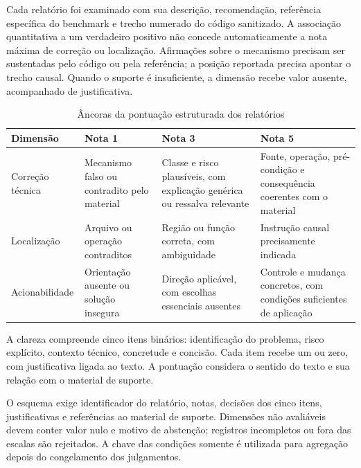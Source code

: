 Cada relatório foi examinado com sua descrição, recomendação, referência
específica do benchmark e trecho numerado do código sanitizado. A associação
quantitativa a um verdadeiro positivo não concede automaticamente a nota máxima
de correção ou localização. Afirmações sobre o mecanismo precisam ser
sustentadas pelo código ou pela referência; a posição reportada precisa apontar
o trecho causal. Quando o suporte é insuficiente, a dimensão recebe valor
ausente, acompanhado de justificativa.

\begin{table}[htbp]
\ABNTEXfontereduzida
\caption{\label{tab:rubrica-pontuacao-estruturada}Âncoras da pontuação estruturada dos relatórios}
\centering
\begin{tabularx}{\textwidth}{|l|X|X|X|}
\hline
\textbf{Dimensão} & \textbf{Nota 1} & \textbf{Nota 3} & \textbf{Nota 5} \\
\hline
Correção técnica & Mecanismo falso ou contradito pelo material & Classe e risco plausíveis, com explicação genérica ou ressalva relevante & Fonte, operação, pré-condição e consequência coerentes com o material \\
\hline
Localização & Arquivo ou operação contraditos & Região ou função correta, com ambiguidade & Instrução causal precisamente indicada \\
\hline
Acionabilidade & Orientação ausente ou solução insegura & Direção aplicável, com escolhas essenciais ausentes & Controle e mudança concretos, com condições suficientes de aplicação \\
\hline
\end{tabularx}
\end{table}

A clareza compreende cinco itens binários: identificação do problema, risco
explícito, contexto técnico, concretude e concisão. Cada item recebe um ou zero,
com justificativa ligada ao texto. A pontuação considera o sentido do texto e
sua relação com o material de suporte.

O esquema  exige
identificador do relatório, notas, decisões dos
cinco itens, justificativas e referências ao material de suporte. Dimensões não
avaliáveis devem conter valor nulo e motivo de abstenção; registros incompletos
ou fora das escalas são rejeitados. A chave das condições somente é utilizada
para agregação depois do congelamento dos julgamentos.

